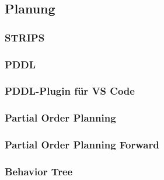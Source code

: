 \subsection {Planung}
\subsubsection{STRIPS}
\subsubsection{PDDL}
\subsubsection{PDDL-Plugin für VS Code}
\subsubsection{Partial Order Planning}
\subsubsection{Partial Order Planning Forward}
\citep{popf}
\subsubsection{Behavior Tree}

\newpage